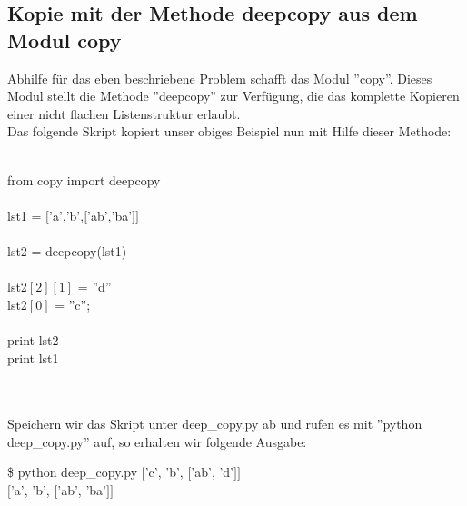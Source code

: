 \subsection{Kopie mit der Methode deepcopy aus dem Modul copy}
Abhilfe für das eben beschriebene Problem schafft das Modul ''copy''. Dieses Modul stellt die Methode ''deepcopy'' zur Verfügung, die das komplette Kopieren einer nicht flachen Listenstruktur erlaubt.\\
Das folgende Skript kopiert unser obiges Beispiel nun mit Hilfe dieser Methode:\\
\\
\begin{MyConsoleBox}{
from copy import deepcopy \\
\\
lst1 = $[$'a','b',$[$'ab','ba'$]]$ \\
\\
lst2 = deepcopy(lst1) \\
\\
lst2$[2][1]$ = ''d'' \\
lst2$[0]$ = ''c''; \\
\\
print lst2 \\
print lst1 \\
}\end{MyConsoleBox}
\\ \\
Speichern wir das Skript unter deep\_copy.py ab und rufen es mit ''python deep\_copy.py'' auf, so erhalten wir folgende Ausgabe: \\
\begin{MyConsoleBox}{
\$ python deep\_copy.py 
$[$'c', 'b', $[$'ab', 'd'$]]$ \\
$[$'a', 'b', $[$'ab', 'ba'$]]$
}\end{MyConsoleBox}
\\
